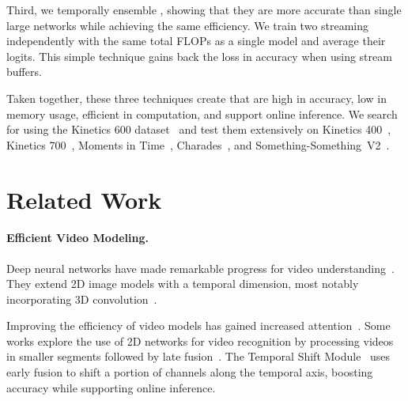 \documentclass[final]{cvpr}
\begin{document}
Third, we temporally ensemble \ournets, showing that they are more accurate than single large networks while achieving the same efficiency.
We train two streaming \ournets independently with the same total FLOPs as a single model and average their logits.
This simple technique gains back the loss in accuracy when using stream buffers.

Taken together, these three techniques create \ournets that are high in accuracy, low in memory usage, efficient in computation, and support online inference.
We search for \ournets using the Kinetics 600 dataset~\cite{carreira2018short} and test them extensively on Kinetics 400~\cite{kay2017kinetics}, Kinetics 700~\cite{carreira2019short}, Moments in Time~\cite{monfort2019moments}, Charades~\cite{sigurdsson2016hollywood}, and Something-Something~V2~\cite{goyal2017something}.
 
\section{Related Work} \label{sec:related-work}
\paragraph{Efficient Video Modeling.}

Deep neural networks have made remarkable progress for video understanding~\cite{ji20123d,simonyan2014two,tran2015learning, wang2016temporal,carreira2017quo, wang2018non,qiu2019learning,feichtenhofer2020x3d,feichtenhofer2019slowfast}.
They extend 2D image models with a temporal dimension, most notably incorporating 3D convolution~\cite{ji20123d,taylor2010convolutional,tran2015learning,xie2017rethinking,hara2018can,qiu2017learning,jiang2019stm,ryoo2019assemblenet}.


Improving the efficiency of video models has gained increased attention~\cite{feichtenhofer2019slowfast,tran2019video,feichtenhofer2017spatiotemporal,feichtenhofer2020x3d,lin2019tsm,fan2019more,bhardwaj2019efficient,chen2018big,li2020smallbignet,piergiovanni2020tiny}.
Some works explore the use of 2D networks for video recognition by processing videos in smaller segments followed by late fusion~\cite{karpathy2014large,donahue2015long,yue2015beyond,wang2016temporal,feichtenhofer2017spatiotemporal,sun2017lattice,li2018recurrent,li2018videolstm,wang2018non,zhou2018temporal,zhu2020faster}. 
The Temporal Shift Module~\cite{lin2019tsm} uses early fusion to shift a portion of channels along the temporal axis, boosting accuracy while supporting online inference.
\end{document}
